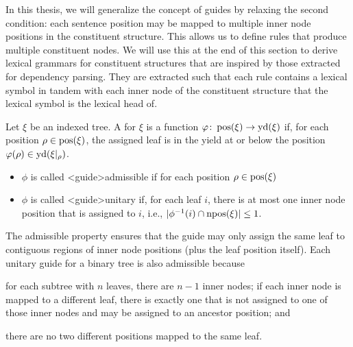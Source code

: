 \documentclass[../../document.tex]{subfiles}
\begin{document}
    In this thesis, we will generalize the concept of guides by relaxing the second condition: each sentence position may be mapped to multiple inner node positions in the constituent structure.
    This allows us to define rules that produce multiple constituent nodes.
    We will use this at the end of this section to derive lexical grammars for constituent structures that are inspired by those extracted for dependency parsing.
    They are extracted such that each rule contains a lexical symbol in tandem with each inner node of the constituent structure that the lexical symbol is the lexical head of.

    \begin{definition}[Guide]
        Let \(\xi\) be an indexed tree.
        A  for \(\xi\) is a function \(\varphi\colon \operatorname{pos}(\xi) \to \operatorname{yd}(\xi)\) if, for each position \(\rho \in \operatorname{pos}(\xi)\), the assigned leaf is in the yield at or below the position \(\varphi(\rho) \in \operatorname{yd}(\xi|_\rho)\).
        \begin{itemize}
            \item \(\phi\) is called <guide>{admissible} if for each position \(\rho \in \operatorname{pos}(\xi)\)
            \item \(\phi\) is called <guide>{unitary} if, for each leaf \(i\), there is at most one inner node position that is assigned to \(i\), i.e., \(|\phi^{-1}(i) \cap \operatorname{npos}(\xi)| \leq 1\).
        \end{itemize}
    \end{definition}

    The admissible property ensures that the guide may only assign the same leaf to contiguous regions of inner node positions (plus the leaf position itself).
    Each unitary guide for a binary tree is also admissible because
    \begin{inparaenum}
        \item for each subtree with \(n\) leaves, there are \(n-1\) inner nodes; if each inner node is mapped to a different leaf, there is exactly one that is not assigned to one of those inner nodes and may be assigned to an ancestor position; and
        \item there are no two different positions mapped to the same leaf.
    \end{inparaenum}
\end{document}

